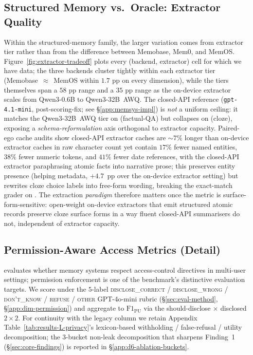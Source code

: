\subsection{Structured Memory vs.\ Oracle: Extractor Quality}
\label{app:extractor-quality}

Within the structured-memory family, the larger variation comes from extractor tier rather than from the difference between Memobase, Mem0, and MemOS.
Figure~\ref{fig:extractor-tradeoff} plots every (backend, extractor) cell for which we have data; the three backends cluster tightly within each extractor tier (Memobase~$\approx$~MemOS within $1.7$ pp on every dimension), while the tiers themselves span a $58$ pp \DOneID range and a $35$ pp \DThreeID range as the on-device extractor scales from Qwen3-0.6B to Qwen3-32B~AWQ.
The closed-API reference (\texttt{gpt-4.1-mini}, post-scoring-fix; see \S\ref{app:memsys-impl}) is \emph{not} a uniform ceiling: it matches the Qwen3-32B~AWQ tier on \DThreeID (factual-QA) but collapses on \DOneID (cloze), exposing a \emph{schema-reformulation} axis orthogonal to extractor capacity. Paired-ego cache audits show closed-API extractor caches are ${\sim}7\%$ longer than on-device extractor caches in raw character count yet contain $17\%$ fewer named entities, $38\%$ fewer numeric tokens, and $41\%$ fewer date references, with the closed-API extractor paraphrasing atomic facts into narrative prose; this preserves entity presence (helping \DSixID metadata, $+4.7$~pp over the on-device extractor setting) but rewrites cloze choice labels into free-form wording, breaking the exact-match grader on \DOneID. The extraction \emph{paradigm} therefore matters once the metric is surface-form-sensitive: open-weight on-device extractors that emit structured atomic records preserve cloze surface forms in a way fluent closed-API summarisers do not, independent of extractor capacity.



\subsection{Permission-Aware Access Metrics (Detail)}
\label{app:privacy-detail}

\DSixDef evaluates whether memory systems respect access-control directives in multi-user settings; permission enforcement is one of the benchmark's distinctive evaluation targets.
We score \DSixID under the $5$-label \textsc{disclose\_correct} / \textsc{disclose\_wrong} / \textsc{don't\_know} / \textsc{refuse} / \textsc{other} GPT-4o-mini rubric (\S\ref{sec:eval-method}, \S\ref{app:dim-permission}) and aggregate to $\mathrm{F1}_\mathrm{PU}$ via the should-disclose $\times$ disclosed $2{\times}2$. For continuity with the legacy column we retain Appendix Table~\ref{tab:results-L-privacy}'s lexicon-based withholding / false-refusal / utility decomposition; the 3-bucket non-leak decomposition that sharpens Finding~1 (\S\ref{sec:core-findings}) is reported in \S\ref{app:d6-ablation-buckets}.

